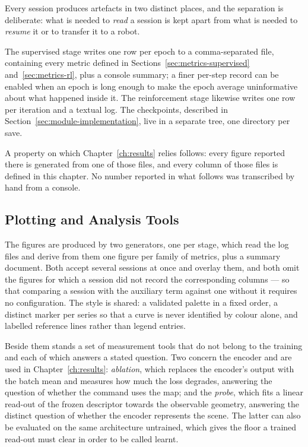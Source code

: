 Every session produces artefacts in two distinct places, and the separation is
deliberate: what is needed to \emph{read} a session is kept apart from what is
needed to \emph{resume} it or to transfer it to a robot.

The supervised stage writes one row per epoch to a comma-separated file,
containing every metric defined in Sections~\ref{sec:metrics-supervised}
and~\ref{sec:metrics-rl}, plus a console summary; a finer per-step record can be
enabled when an epoch is long enough to make the epoch average uninformative
about what happened inside it. The reinforcement stage likewise writes one row
per iteration and a textual log. The checkpoints, described in
Section~\ref{sec:module-implementation}, live in a separate tree, one directory
per save.

A property on which Chapter~\ref{ch:results} relies follows: every figure
reported there is generated from one of those files, and every column of those
files is defined in this chapter. No number reported in what follows was
transcribed by hand from a console.

\subsection{Plotting and Analysis Tools}

The figures are produced by two generators, one per stage, which read the log
files and derive from them one figure per family of metrics, plus a summary
document. Both accept several sessions at once and overlay them, and both omit
the figures for which a session did not record the corresponding columns --- so
that comparing a session with the auxiliary term against one without it requires
no configuration. The style is shared: a validated palette in a fixed order, a
distinct marker per series so that a curve is never identified by colour alone,
and labelled reference lines rather than legend entries.

Beside them stands a set of measurement tools that do not belong to the training
and each of which answers a stated question. Two concern the encoder and are
used in Chapter~\ref{ch:results}: \emph{ablation}, which replaces the encoder's
output with the batch mean and measures how much the loss degrades, answering
the question of whether the command uses the map; and the \emph{probe}, which
fits a linear read-out of the frozen descriptor towards the observable geometry,
answering the distinct question of whether the encoder represents the scene. The
latter can also be evaluated on the same architecture untrained, which gives the
floor a trained read-out must clear in order to be called learnt.

